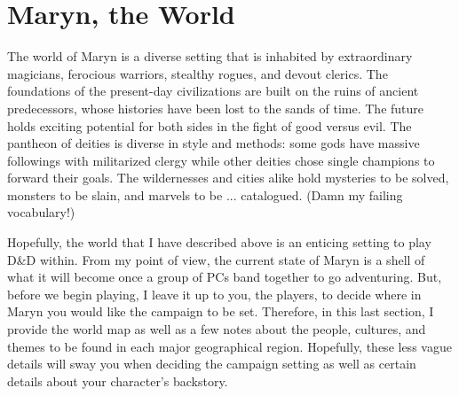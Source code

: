 \documentclass[12pt]{article}
\begin{document}

\section{Maryn, the World}
\textsf{The world of Maryn is a diverse setting that is inhabited by extraordinary magicians, ferocious warriors, stealthy rogues, and devout clerics. The foundations of the present-day civilizations are built on the ruins of ancient predecessors, whose histories have been lost to the sands of time. The future holds exciting potential for both sides in the fight of good versus evil. The pantheon of deities is diverse in style and methods: some gods have massive followings with militarized clergy while other deities chose single champions to forward their goals. The wildernesses and cities alike hold mysteries to be solved, monsters to be slain, and marvels to be ... catalogued. (Damn my failing vocabulary!)}

\textsf{Hopefully, the world that I have described above is an enticing setting to play D\&D within. From my point of view, the current state of Maryn is a shell of what it will become once a group of PCs band together to go adventuring. But, before we begin playing, I leave it up to you, the players, to decide where in Maryn you would like the campaign to be set. Therefore, in this last section, I provide the world map as well as a few notes about the people, cultures, and themes to be found in each major geographical region. Hopefully, these less vague details will sway you when deciding the campaign setting as well as certain details about your character's backstory.}
\end{document}
